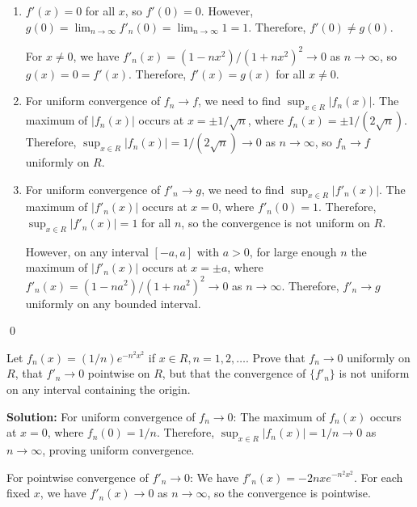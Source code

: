 \begin{enumerate}[label=(\alph*)]
\item \( f'(x) = 0 \) for all \( x \), so \( f'(0) = 0 \). However, \( g(0) = \lim_{n \to \infty} f'_n(0) = \lim_{n \to \infty} 1 = 1 \). Therefore, \( f'(0) \neq g(0) \).

For \( x \neq 0 \), we have \( f'_n(x) = (1 - nx^2)/(1 + nx^2)^2 \to 0 \) as \( n \to \infty \), so \( g(x) = 0 = f'(x) \). Therefore, \( f'(x) = g(x) \) for all \( x \neq 0 \).

\item For uniform convergence of \( f_n \to f \), we need to find \( \sup_{x \in R} |f_n(x)| \). The maximum of \( |f_n(x)| \) occurs at \( x = \pm 1/\sqrt{n} \), where \( f_n(x) = \pm 1/(2\sqrt{n}) \). Therefore, \( \sup_{x \in R} |f_n(x)| = 1/(2\sqrt{n}) \to 0 \) as \( n \to \infty \), so \( f_n \to f \) uniformly on \( R \).

\item For uniform convergence of \( f'_n \to g \), we need to find \( \sup_{x \in R} |f'_n(x)| \). The maximum of \( |f'_n(x)| \) occurs at \( x = 0 \), where \( f'_n(0) = 1 \). Therefore, \( \sup_{x \in R} |f'_n(x)| = 1 \) for all \( n \), so the convergence is not uniform on \( R \).

However, on any interval \([-a, a]\) with \( a > 0 \), for large enough \( n \) the maximum of \( |f'_n(x)| \) occurs at \( x = \pm a \), where \( f'_n(x) = (1 - na^2)/(1 + na^2)^2 \to 0 \) as \( n \to \infty \). Therefore, \( f'_n \to g \) uniformly on any bounded interval.
\end{enumerate}\qed


\begin{problembox}
Let \( f_n(x) = (1/n)e^{-n^2x^2} \) if \( x \in R, n = 1, 2, \ldots \). Prove that \( f_n \to 0 \) uniformly on \( R \), that \( f'_n \to 0 \) pointwise on \( R \), but that the convergence of \(\{f'_n\}\) is not uniform on any interval containing the origin.
\end{problembox}

\bigskip\noindent\textbf{Solution:} For uniform convergence of \( f_n \to 0 \): The maximum of \( f_n(x) \) occurs at \( x = 0 \), where \( f_n(0) = 1/n \). Therefore, \( \sup_{x \in R} |f_n(x)| = 1/n \to 0 \) as \( n \to \infty \), proving uniform convergence.

For pointwise convergence of \( f'_n \to 0 \): We have \( f'_n(x) = -2nxe^{-n^2x^2} \). For each fixed \( x \), we have \( f'_n(x) \to 0 \) as \( n \to \infty \), so the convergence is pointwise.

